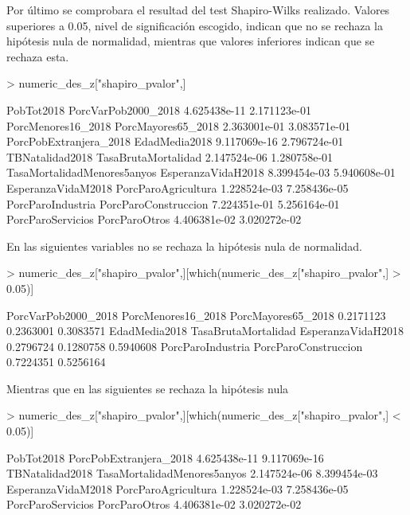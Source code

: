 \documentclass[11pt]{article}
\begin{document}
Por último se comprobara el resultad del test Shapiro-Wilks realizado. Valores superiores a 0.05, nivel de significación escogido, indican que no se rechaza la hipótesis nula de normalidad, mientras que valores inferiores indican que se rechaza esta.
\begin{Schunk}
\begin{Sinput}
> numeric_des_z["shapiro_pvalor",]
\end{Sinput}
\begin{Soutput}
                 PobTot2018         PorcVarPob2000_2018 
               4.625438e-11                2.171123e-01 
         PorcMenores16_2018          PorcMayores65_2018 
               2.363001e-01                3.083571e-01 
     PorcPobExtranjera_2018               EdadMedia2018 
               9.117069e-16                2.796724e-01 
            TBNatalidad2018         TasaBrutaMortalidad 
               2.147524e-06                1.280758e-01 
TasaMortalidadMenores5anyos          EsperanzaVidaH2018 
               8.399454e-03                5.940608e-01 
         EsperanzaVidaM2018         PorcParoAgricultura 
               1.228524e-03                7.258436e-05 
          PorcParoIndustria        PorcParoConstruccion 
               7.224351e-01                5.256164e-01 
          PorcParoServicios               PorcParoOtros 
               4.406381e-02                3.020272e-02 
\end{Soutput}
\end{Schunk}
En las siguientes variables no se rechaza la hipótesis nula de normalidad.
\begin{Schunk}
\begin{Sinput}
> numeric_des_z["shapiro_pvalor",][which(numeric_des_z["shapiro_pvalor",] > 0.05)]
\end{Sinput}
\begin{Soutput}
 PorcVarPob2000_2018   PorcMenores16_2018   PorcMayores65_2018 
           0.2171123            0.2363001            0.3083571 
       EdadMedia2018  TasaBrutaMortalidad   EsperanzaVidaH2018 
           0.2796724            0.1280758            0.5940608 
   PorcParoIndustria PorcParoConstruccion 
           0.7224351            0.5256164 
\end{Soutput}
\end{Schunk}
Mientras que en las siguientes se rechaza la hipótesis nula
\begin{Schunk}
\begin{Sinput}
> numeric_des_z["shapiro_pvalor",][which(numeric_des_z["shapiro_pvalor",] < 0.05)]
\end{Sinput}
\begin{Soutput}
                 PobTot2018      PorcPobExtranjera_2018 
               4.625438e-11                9.117069e-16 
            TBNatalidad2018 TasaMortalidadMenores5anyos 
               2.147524e-06                8.399454e-03 
         EsperanzaVidaM2018         PorcParoAgricultura 
               1.228524e-03                7.258436e-05 
          PorcParoServicios               PorcParoOtros 
               4.406381e-02                3.020272e-02 
\end{Soutput}
\end{Schunk}
\end{document}
